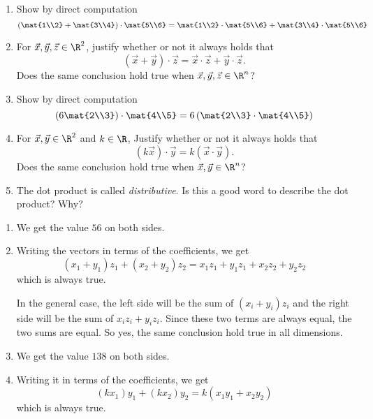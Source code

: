 \begin{exercises}
\begin{problist}
\begin{enumerate}
			\item Show by direct computation
			\[
			\left(\mat{1\\2} + \mat{3\\4}\right) \cdot \mat{5\\6} =
			\mat{1\\2} \cdot \mat{5\\6} + \mat{3\\4} \cdot \mat{5\\6}
			\]
			\item
			For $\vec x,\vec y,\vec z\in \R^2$, justify whether or not it always holds that
			\[
			(\vec x + \vec y) \cdot \vec z = \vec x \cdot \vec z + \vec y \cdot \vec z.
			\]
			Does the same conclusion hold true when $\vec x,\vec y,\vec z\in \R^n$?
			\item Show by direct computation
			\[
			\left(6\mat{2\\3}\right) \cdot \mat{4\\5} =
			6\left(\mat{2\\3} \cdot \mat{4\\5}\right)
			\]
			\item
			For $\vec x,\vec y\in \R^2$ and $k \in \R$, Justify whether or not it always holds that
			\[
			(k\vec x) \cdot \vec y = k(\vec x \cdot \vec y).
			\]
			Does the same conclusion hold true when $\vec x,\vec y\in \R^n$?
			
			\item The dot product is called \emph{distributive}.
			Is this a good word to describe the dot product? Why?
		\end{enumerate}
		\begin{solution}
			\begin{enumerate}
				\item We get the value $56$ on both sides.
				
				\item Writing the vectors in terms of the coefficients, we get
				\[(x_1+y_1)z_1+(x_2+y_2)z_2=x_1z_1+y_1z_1+x_2z_2+y_2z_2\]
				which is always true.
				
				In the general case, the left side will be the sum of $(x_i+y_i)z_i$ and the right side 
				will be the sum of $x_iz_i+y_iz_i$. Since these two terms are always equal, the two sums 
				are equal. So yes, the same conclusion hold true in all dimensions.
				
				\item We get the value $138$ on both sides.
				
				\item Writing it in terms of the coefficients, we get
				\[(kx_1)y_1+(kx_2)y_2=k(x_1y_1+x_2y_2)\]
				which is always true.
				

\end{enumerate}
\end{solution}
\end{problist}
\end{exercises}
